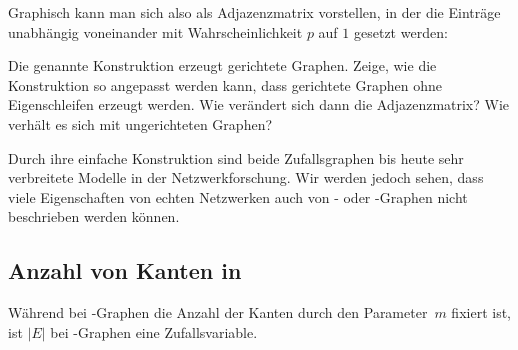 \noindent
Graphisch kann man sich also \Gnp als Adjazenzmatrix vorstellen, in der die Einträge unabhängig voneinander mit Wahrscheinlichkeit $p$ auf $1$ gesetzt werden:

\begin{center}

\end{center}

\begin{exercise}
    Die genannte Konstruktion erzeugt gerichtete Graphen.
    Zeige, wie die Konstruktion so angepasst werden kann, dass gerichtete Graphen ohne Eigenschleifen erzeugt werden.
    Wie verändert sich dann die Adjazenzmatrix?
    Wie verhält es sich mit ungerichteten Graphen?
\end{exercise}

Durch ihre einfache Konstruktion sind beide Zufallsgraphen bis heute sehr verbreitete Modelle in der Netzwerkforschung.
Wir werden jedoch sehen, dass viele Eigenschaften von echten Netzwerken auch von \Gnp- oder \Gnm-Graphen nicht beschrieben werden können.

\subsection{Anzahl von Kanten in \Gnp}\label{subsec:anzahl_kanten_in_gnp}
Während bei \Gnm-Graphen die Anzahl der Kanten durch den Parameter~$m$ fixiert ist, ist $|E|$ bei \Gnp-Graphen eine Zufallsvariable.

